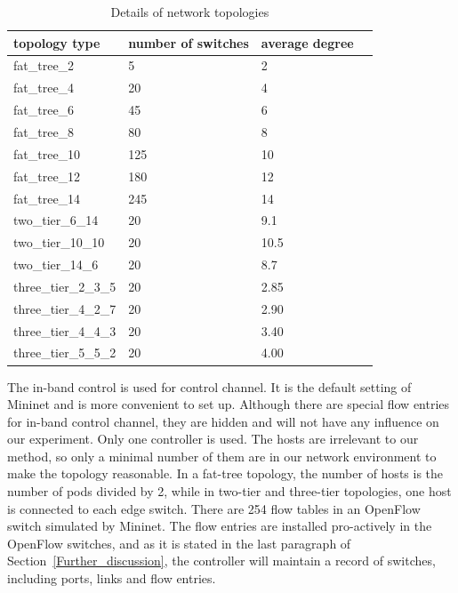 \begin{table}[H]
\centering
\caption{Details of network topologies}
\begin{tabular}{|l|l|l|l|}
\hline topology type & number of switches & average degree \\
\hline
\hline fat\_tree\_2 & 5 & 2 \\
\hline fat\_tree\_4 & 20 & 4 \\
\hline fat\_tree\_6 & 45 & 6 \\
\hline fat\_tree\_8 & 80 & 8 \\
\hline fat\_tree\_10 & 125 & 10 \\
\hline fat\_tree\_12 & 180 & 12 \\
\hline fat\_tree\_14 & 245 & 14 \\
\hline two\_tier\_6\_14 & 20 & 9.1 \\
\hline two\_tier\_10\_10 & 20 & 10.5 \\
\hline two\_tier\_14\_6 & 20 & 8.7 \\
\hline three\_tier\_2\_3\_5 & 20 & 2.85 \\
\hline three\_tier\_4\_2\_7 & 20 & 2.90 \\
\hline three\_tier\_4\_4\_3 & 20 & 3.40 \\
\hline three\_tier\_5\_5\_2 & 20 & 4.00 \\
\hline 
\end{tabular}
\label{table:network_env}
\end{table}

The in-band control is used for control channel. It is the default setting of Mininet and is more convenient to set up. Although there are special flow entries for in-band control channel, they are hidden and will not have any influence on our experiment. Only one controller is used. The hosts are irrelevant to our method, so only a minimal number of them are in our network environment to make the topology reasonable. In a fat-tree topology, the number of hosts is the number of pods divided by 2, while in two-tier and three-tier topologies, one host is connected to each edge switch. There are 254 flow tables in an OpenFlow switch simulated by Mininet. The flow entries are installed pro-actively in the OpenFlow switches, and as it is stated in the last paragraph of Section~\ref{Further_discussion}, the controller will maintain a record of switches, including ports, links and flow entries. 

